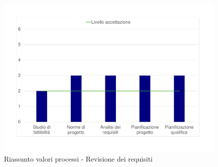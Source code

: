 \begin{figure}[H]
	\centering
	\includegraphics[scale=0.5]{images/resoconto/RR/chart-RR.pdf}
	\caption{Riassunto valori processi - Revisione dei requisiti}
\end{figure}

\newpage
